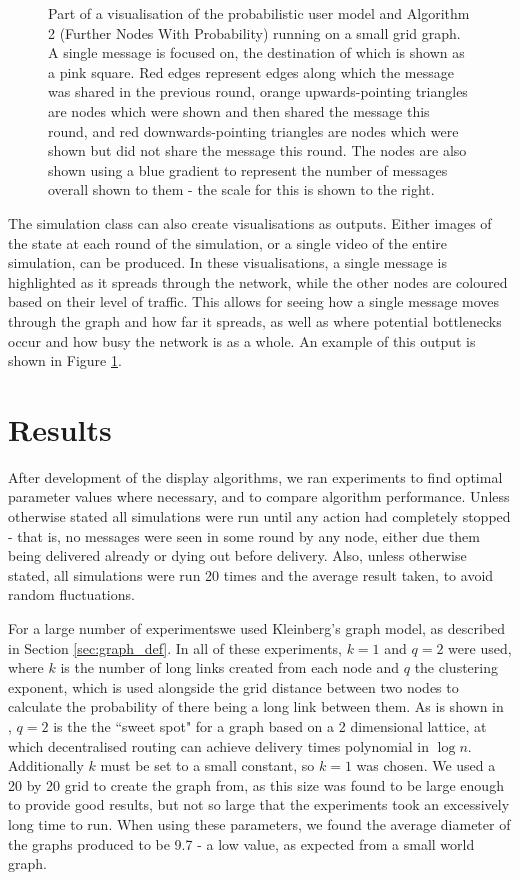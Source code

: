 \documentclass[bsc,frontabs,twoside,singlespacing,parskip,deptreport]{infthesis}     %
\begin{document}
\begin{figure}
\begin{subfigure}[]{0.47\textwidth}
\end{subfigure}
\caption{Part of a visualisation of the probabilistic user model and Algorithm 2 (Further Nodes With Probability) running on a small grid graph. A single message is focused on, the destination of which is shown as a pink square. Red edges represent edges along which the message was shared in the previous round, orange upwards-pointing triangles are nodes which were shown and then shared the message this round, and red downwards-pointing triangles are nodes which were shown but did not share the message this round. The nodes are also shown using a blue gradient to represent the number of messages overall shown to them - the scale for this is shown to the right.}
\label{fig:visualisation}
\end{figure}

The simulation class can also create visualisations as outputs. Either images of the state at each round of the simulation, or a single video of the entire simulation, can be produced. In these visualisations, a single message is highlighted as it spreads through the network, while the other nodes are coloured based on their level of traffic. This allows for seeing how a single message moves through the graph and how far it spreads, as well as where potential bottlenecks occur and how busy the network is as a whole. An example of this output is shown in Figure \ref{fig:visualisation}.


\chapter{Results} \label{chapter4}
After development of the display algorithms, we ran experiments to find optimal parameter values where necessary, and to compare algorithm performance. Unless otherwise stated all simulations were run until any action had completely stopped - that is, no messages were seen in some round by any node, either due them being delivered already or dying out before delivery. Also, unless otherwise stated, all simulations were run 20 times and the average result taken, to avoid random fluctuations.

For a large number of experimentswe used Kleinberg's graph model, as described in Section \ref{sec:graph_def}. In all of these experiments, $k=1$ and $q=2$ were used, where $k$ is the number of long links created from each node and $q$ the clustering exponent, which is used alongside the grid distance between two nodes to calculate the probability of there being a long link between them. As is shown in \cite{Kleinberg00},  $q=2$ is the the ``sweet spot" for a graph based on a 2 dimensional lattice, at which decentralised routing can achieve delivery times polynomial in $\log n$. Additionally $k$ must be set to a small constant, so $k=1$ was chosen. We used a 20 by 20 grid to create the graph from, as this size was found to be large enough to provide good results, but not so large that the experiments took an excessively long time to run. When using these parameters, we found the average diameter of the graphs produced to be 9.7 - a low value, as expected from a small world graph.
\end{document}
